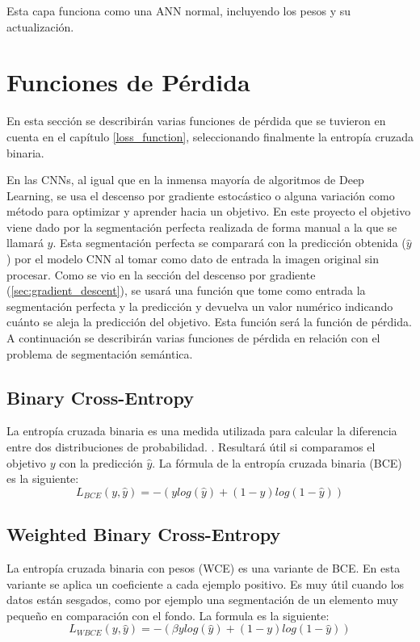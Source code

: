 Esta capa funciona como una ANN normal, incluyendo los pesos y su actualización.

\section{Funciones de Pérdida}\label{cnn_loss_func}

En esta sección se describirán varias funciones de pérdida que se tuvieron en cuenta en el capítulo \ref{loss_function}, seleccionando finalmente la entropía cruzada binaria.

En las CNNs, al igual que en la inmensa mayoría de algoritmos de Deep Learning, se usa el descenso por gradiente estocástico o alguna variación como método para optimizar y aprender hacia un objetivo. En este proyecto el objetivo viene dado por la segmentación perfecta realizada de forma manual a la que se llamará $y$. Esta segmentación perfecta se comparará con la predicción obtenida ($\hat{y}$) por el modelo CNN al tomar como dato de entrada la imagen original sin procesar. Como se vio en la sección del descenso por gradiente (\ref{sec:gradient_descent}), se usará una función que tome como entrada la segmentación perfecta y la predicción y devuelva un valor numérico indicando cuánto se aleja la predicción del objetivo. Esta función será la función de pérdida. A continuación se describirán varias funciones de pérdida en relación con el problema de segmentación semántica.

\subsection{Binary Cross-Entropy}\label{cnn_bce}

La entropía cruzada binaria es una medida utilizada para calcular la diferencia entre dos distribuciones de probabilidad. \cite{Jadon2020}. Resultará útil si comparamos el objetivo $y$ con la predicción $\hat{y}$. La fórmula de la entropía cruzada binaria (BCE) es la siguiente:
\begin{equation}
L_{BCE}(y,\hat{y})=-(y log(\hat{y}) + (1-y)log(1-\hat{y}))
\end{equation}

\subsection{Weighted Binary Cross-Entropy}\label{cnn_wbce}

La entropía cruzada binaria con pesos (WCE) es una variante de BCE. En esta variante se aplica un coeficiente a cada ejemplo positivo. Es muy útil cuando los datos están sesgados, como por ejemplo una segmentación de un elemento muy pequeño en comparación con el fondo. La formula es la siguiente:
\begin{equation}
L_{WBCE}(y,\hat{y})=-(\beta y log(\hat{y}) + (1-y)log(1-\hat{y}))
\end{equation}


